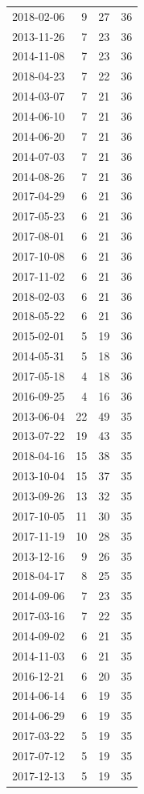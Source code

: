 \begin{tabular}{lrrr}
2018-02-06 & 9 & 27 & 36 \\
2013-11-26 & 7 & 23 & 36 \\
2014-11-08 & 7 & 23 & 36 \\
2018-04-23 & 7 & 22 & 36 \\
2014-03-07 & 7 & 21 & 36 \\
2014-06-10 & 7 & 21 & 36 \\
2014-06-20 & 7 & 21 & 36 \\
2014-07-03 & 7 & 21 & 36 \\
2014-08-26 & 7 & 21 & 36 \\
2017-04-29 & 6 & 21 & 36 \\
2017-05-23 & 6 & 21 & 36 \\
2017-08-01 & 6 & 21 & 36 \\
2017-10-08 & 6 & 21 & 36 \\
2017-11-02 & 6 & 21 & 36 \\
2018-02-03 & 6 & 21 & 36 \\
2018-05-22 & 6 & 21 & 36 \\
2015-02-01 & 5 & 19 & 36 \\
2014-05-31 & 5 & 18 & 36 \\
2017-05-18 & 4 & 18 & 36 \\
2016-09-25 & 4 & 16 & 36 \\
2013-06-04 & 22 & 49 & 35 \\
2013-07-22 & 19 & 43 & 35 \\
2018-04-16 & 15 & 38 & 35 \\
2013-10-04 & 15 & 37 & 35 \\
2013-09-26 & 13 & 32 & 35 \\
2017-10-05 & 11 & 30 & 35 \\
2017-11-19 & 10 & 28 & 35 \\
2013-12-16 & 9 & 26 & 35 \\
2018-04-17 & 8 & 25 & 35 \\
2014-09-06 & 7 & 23 & 35 \\
2017-03-16 & 7 & 22 & 35 \\
2014-09-02 & 6 & 21 & 35 \\
2014-11-03 & 6 & 21 & 35 \\
2016-12-21 & 6 & 20 & 35 \\
2014-06-14 & 6 & 19 & 35 \\
2014-06-29 & 6 & 19 & 35 \\
2017-03-22 & 5 & 19 & 35 \\
2017-07-12 & 5 & 19 & 35 \\
2017-12-13 & 5 & 19 & 35 \\

\end{tabular}
